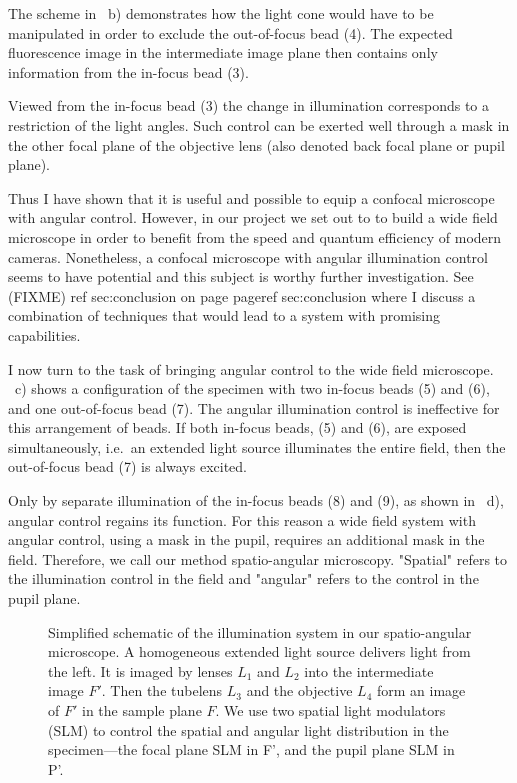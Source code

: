The scheme in ~b) demonstrates how
the light cone would have to be manipulated in order to exclude the out-of-focus
bead (4). The expected fluorescence image in the
intermediate image plane then contains only information from the
in-focus bead (3).

Viewed from the in-focus bead (3) the change in illumination
corresponds to a restriction of the light angles. Such control can be
exerted well through a mask in the other focal plane of the objective
lens (also denoted back focal plane or pupil plane).

Thus I have shown that it is useful and possible to equip a confocal
microscope with angular control. However, in our project we set out to
to build a wide field microscope in order to benefit from the speed
and quantum efficiency of modern cameras.  Nonetheless, a confocal
microscope with angular illumination control seems to have potential
and this subject is worthy further investigation.  See (FIXME) ref
sec:conclusion on page pageref sec:conclusion where I discuss a
combination of techniques that would lead to a system with promising capabilities.

I now turn to the task of bringing angular control to the wide field
microscope. ~c) shows a configuration of the
specimen with two in-focus beads (5) and (6), and one out-of-focus
bead (7).  The angular illumination control is ineffective for this
arrangement of beads.  If both in-focus beads, (5) and (6), are exposed
simultaneously, i.e.\ an extended light source illuminates the entire field,
then the out-of-focus bead (7) is always excited.

Only by separate illumination of the in-focus beads (8)
and (9), as shown in ~d), angular control
regains its function. For this reason a wide field system with angular
control, using a mask in the pupil, requires an additional mask in the
field.  Therefore, we call our method spatio-angular
microscopy. "Spatial" refers to the illumination control in the field
and "angular" refers to the control in the pupil plane.


\begin{figure}[!hbt]
  \centering
  \caption{Simplified schematic of the illumination system in our
    spatio-angular microscope. A homogeneous extended light source
    delivers light from the left. It is imaged by lenses $L_1$ and $L_2$ into
    the intermediate image $F'$. Then the tubelens $L_3$ and the
    objective $L_4$ form an image of $F'$ in the sample plane $F$. We
    use two spatial light modulators (SLM) to control the spatial and angular
light distribution in the specimen---the focal plane SLM in F', and the pupil plane SLM in
    P'.}
  \label{fig:memi-simple}
\end{figure}


